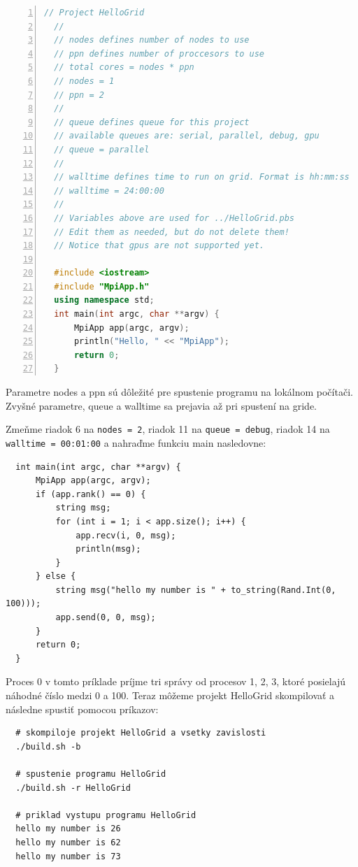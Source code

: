 \begin{lstlisting}[language=c++, caption={HelloGrid/src/main.cpp}, numbers=left]
  // Project HelloGrid
  //
  // nodes defines number of nodes to use
  // ppn defines number of proccesors to use
  // total cores = nodes * ppn
  // nodes = 1
  // ppn = 2
  //
  // queue defines queue for this project
  // available queues are: serial, parallel, debug, gpu
  // queue = parallel
  //
  // walltime defines time to run on grid. Format is hh:mm:ss
  // walltime = 24:00:00
  //
  // Variables above are used for ../HelloGrid.pbs
  // Edit them as needed, but do not delete them!
  // Notice that gpus are not supported yet.
  
  #include <iostream>
  #include "MpiApp.h"
  using namespace std;
  int main(int argc, char **argv) {
      MpiApp app(argc, argv);
      println("Hello, " << "MpiApp");
      return 0;
  }
\end{lstlisting}
Parametre nodes a ppn sú dôležité pre spustenie programu na lokálnom počítači. Zvyšné parametre, queue a walltime sa prejavia až pri spustení na gride.

Zmeňme riadok 6 na \texttt{nodes = 2}, riadok 11 na \texttt{queue = debug}, riadok 14 na \texttt{walltime = 00:01:00}
a nahraďme funkciu main nasledovne:
\begin{lstlisting}
  int main(int argc, char **argv) {
      MpiApp app(argc, argv);
      if (app.rank() == 0) {
          string msg;
          for (int i = 1; i < app.size(); i++) {
              app.recv(i, 0, msg);
              println(msg);
          }
      } else {
          string msg("hello my number is " + to_string(Rand.Int(0, 100)));
          app.send(0, 0, msg);
      }
      return 0;
  }  
\end{lstlisting}
Proces 0 v tomto príklade príjme tri správy od procesov 1, 2, 3, ktoré posielajú náhodné číslo medzi 0 a 100.
Teraz môžeme projekt HelloGrid skompilovať a následne spustiť pomocou príkazov:
\begin{lstlisting}
  # skompiloje projekt HelloGrid a vsetky zavislosti
  ./build.sh -b

  # spustenie programu HelloGrid
  ./build.sh -r HelloGrid

  # priklad vystupu programu HelloGrid
  hello my number is 26
  hello my number is 62
  hello my number is 73
\end{lstlisting}


